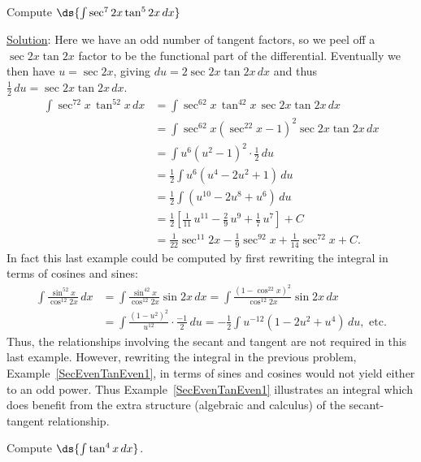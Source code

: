 \bex Compute $\ds{\int\sec^72x\tan^52x\,dx}$

\underline{Solution}:
Here we have an odd number of tangent factors, so we peel off a 
$\sec2x\tan2x$ factor to be the functional part of the differential.
Eventually we then have $u=\sec2x$, giving $du=2\sec2x\tan2x\,dx$
and thus $\frac12\,du=\sec2x\tan2x\,dx$.
\begin{align*}
\int\sec^72x\,\tan^52x\,dx
 &=\int\sec^62x\,\tan^42x\,\sec2x\tan2x\,dx\\
 &=\int\sec^62x\left(\sec^22x-1\right)^2\sec2x\tan2x\,dx\\
 &=\int u^6\left(u^2-1\right)^2\cdot\frac12\,du\\
 &=\frac12\int u^6\left(u^4-2u^2+1\right)\,du\\
 &=\frac12\int\left(u^{10}-2u^8+u^6\right)\,du\\
 &=\frac12\left[\frac1{11}\,u^{11}-\frac29\,u^9+\frac17\,u^7\right]+C\\
 &=\frac1{22}\sec^{11}2x-\frac19\sec^92x+\frac1{14}\sec^72x+C.
\end{align*}
\eex
In fact this last example could be computed by first rewriting
the integral in terms of cosines and sines:
\begin{align*}
\int\frac{\sin^52x}{\cos^{12}2x}\,dx
&=\int\frac{\sin^42x}{\cos^{12}2x}\sin2x\,dx
=\int\frac{\left(1-\cos^22x\right)^2}{\cos^{12}2x}\sin2x\,dx\\
&=\int\frac{\left(1-u^2\right)^2}{u^{12}}\cdot\frac{-1}2\,du
=-\frac12\int u^{-12}\left(1-2u^2+u^4\right)\,du,\text{ etc.}
\end{align*}
Thus, the relationships involving the secant and tangent are
not required in this last example.  However, rewriting
the integral in the previous problem, Example~\ref{SecEvenTanEven1},
in terms of sines and cosines would not yield either to an odd
power.  Thus  Example~\ref{SecEvenTanEven1} illustrates
an integral which does benefit from the extra structure
(algebraic and calculus) of the secant-tangent relationship.

\bex Compute $\ds{\int\tan^4x\,dx}$.

